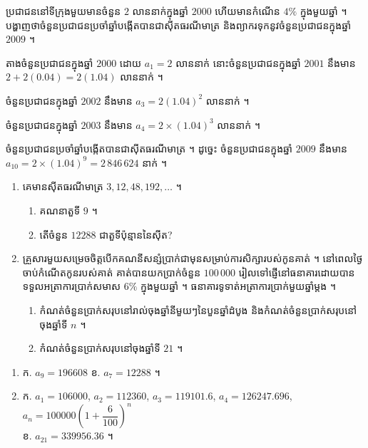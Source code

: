 \begin{example}[លំហាត់គំរូ ២]
ប្រជាជននៅទីក្រុងមួយមានចំនួន $2$ លាននាក់ក្នុងឆ្នាំ $2000$ ហើយមានកំណើន $4\%$ ក្នុងមួយឆ្នាំ ។ បង្ហាញថាចំនួនប្រជាជនប្រចាំឆ្នាំបង្កើតបានជាស៊ីតធរណីមាត្រ និងព្យាករទុកនូវចំនួនប្រជាជនក្នុងឆ្នាំ $2009$ ។
\end{example}
\ans
តាងចំនួនប្រជាជនក្នុងឆ្នាំ $2000$ ដោយ $a_1 = 2$ លាននាក់ នោះចំនួនប្រជាជនក្នុងឆ្នាំ $2001$ នឹងមាន $2 + 2(0.04) = 2(1.04)$ លាននាក់ ។

ចំនួនប្រជាជនក្នុងឆ្នាំ $2002$ នឹងមាន $a_3 = 2(1.04)^2$ លាននាក់ ។

ចំនួនប្រជាជនក្នុងឆ្នាំ $2003$ នឹងមាន $a_4 = 2 \times (1.04)^3$ លាននាក់ ។

ចំនួនប្រជាជនប្រចាំឆ្នាំបង្កើតបានជាស៊ីតធរណីមាត្រ ។ ដូច្នេះ ចំនួនប្រជាជនក្នុងឆ្នាំ $2009$ នឹងមាន $a_{10} = 2 \times (1.04)^9 = 2\,846\,624$ នាក់ ។

\begin{pro}
\begin{enumerate}[1]
  \item គេមានស៊ីតធរណីមាត្រ $3, 12, 48, 192, \ldots$ ។
  \begin{enumerate}[a]
    \item គណនាតួទី $9$ ។
    \item តើចំនួន $12288$ ជាតួទីប៉ុន្មាននៃស៊ីត?
  \end{enumerate}
  \item គ្រួសារមួយសម្រេចចិត្តបើកគណនីសន្សំប្រាក់ជាមុនសម្រាប់ការសិក្សារបស់កូនគាត់ ។ នៅពេលថ្ងៃចាប់កំណើតកូនរបស់គាត់ គាត់បានយកប្រាក់ចំនួន $100\,000$ រៀលទៅផ្ញើនៅធនាគារដោយបានទទួលអត្រាការប្រាក់សមាស $6\%$ ក្នុងមួយឆ្នាំ ។ ធនាគារទូទាត់អត្រាការប្រាក់មួយឆ្នាំម្តង ។
  \begin{enumerate}[a]
    \item កំណត់ចំនួនប្រាក់សរុបនៅរាល់ចុងឆ្នាំនីមួយៗនៃបួនឆ្នាំដំបូង និងកំណត់ចំនួនប្រាក់សរុបនៅចុងឆ្នាំទី $n$ ។
    \item កំណត់ចំនួនប្រាក់សរុបនៅចុងឆ្នាំទី $21$ ។
  \end{enumerate}
\end{enumerate}
\ans
\begin{enumerate}[1]
  \item ក. $a_9 = 196608$ \quad ខ. $a_7 = 12288$ ។
  \item ក. $a_1 = 106000$, $a_2 = 112360$, $a_3 = 119101.6$, $a_4 = 126247.696$, $a_n = 100000\left(1 + \dfrac{6}{100}\right)^n$\\
  ខ. $a_{21} = 339956.36$ ។
\end{enumerate}
\end{pro}

